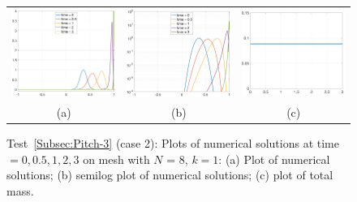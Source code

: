 \documentclass[preprint,11pt]{elsarticle}
\begin{document}
\begin{figure}[H]
\centering
\begin{tabular}{ccc}
\includegraphics[width=.3\textwidth]{./NumFig/Test4-3-3-L8D2}
&\includegraphics[width=.3\textwidth]{./NumFig/Test4-3-3-L8D2-log}
&\includegraphics[width=.3\textwidth]{./NumFig/Test4-3-k1-3-Con_v2}
\\
(a) & (b) &(c)
\end{tabular}
\caption{Test~\ref{Subsec:Pitch-3} (case 2): Plots of numerical solutions at time $=0,0.5,1,2,3$ on mesh with $N$ = 8, $k=1$: (a) Plot of numerical solutions; (b) semilog plot of numerical solutions; (c) plot of total mass.}\label{Fig:Pitch-3-2}
\end{figure}
\end{document}
